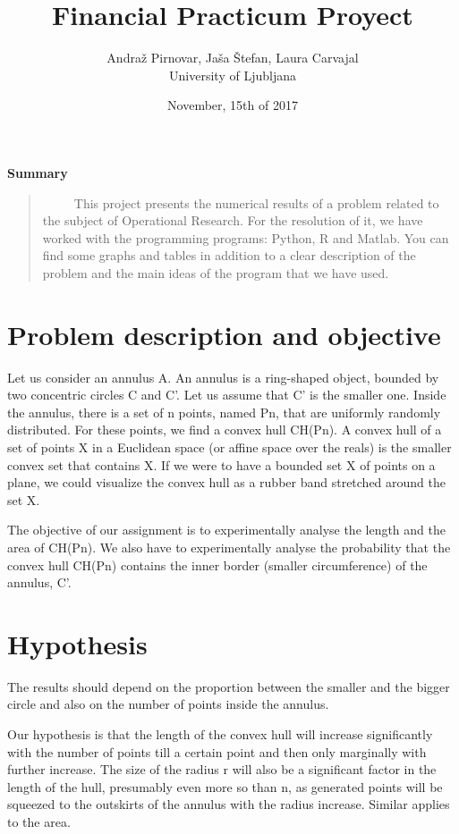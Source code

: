 \documentclass[12pt,a4paper]{article}
\begin{document}
\title{\bf Financial Practicum Proyect }
\author{Andraž Pirnovar, Jaša Štefan, Laura Carvajal  \\ University of Ljubljana}
\date{November, 15th of 2017}
\maketitle{}
\begin{center}
{\small{\bf Summary}}\end{center}
\begin{quote}
{\small 
\ \ \ \ \ This project presents the numerical results of a problem related to the subject of Operational Research. For the resolution of it, we have worked with the programming programs: Python, R and Matlab. You can find some graphs and tables in addition to a clear description of the problem and the main ideas of the program that we have used.}
\end{quote}
\bigskip 
\section*{Problem description and objective}
Let us consider an annulus A. An annulus is a ring-shaped object, bounded by two concentric circles C and C'. Let us assume that C' is the smaller one. Inside the annulus, there is a set of n points, named Pn, that are uniformly randomly distributed. For these points, we find a convex hull CH(Pn). A convex hull of a set of points X in a Euclidean space (or affine space over the reals) is the smaller convex set that contains X. If we were to have a bounded set X of points on a plane, we could visualize the convex hull as a rubber band stretched around the set X. \medskip 
 
The objective of our assignment is to experimentally analyse the length and the area of CH(Pn). We also have to experimentally analyse the probability that the convex hull CH(Pn) contains the inner border (smaller circumference) of the annulus, C'. 
\pagebreak 

\section*{Hypothesis}
The results should depend on the proportion between the smaller and the bigger circle and also on the number of points inside the annulus.\medskip  
 
Our hypothesis is that the length of the convex hull will increase significantly with the number of points till a certain point and then only marginally with further increase. The size of the radius r will also be a significant factor in the length of the hull, presumably even more so than n, as generated points will be squeezed to the outskirts of the annulus with the radius increase. Similar applies to the area.  \medskip 
 
\end{document}
